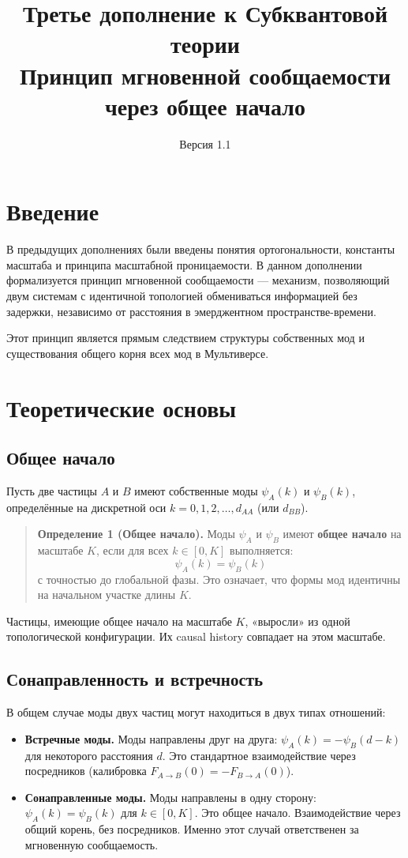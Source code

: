 \documentclass[12pt,a4paper]{article}
\title{\textbf{Третье дополнение к Субквантовой теории}\\
\large Принцип мгновенной сообщаемости через общее начало}
\author{}
\date{Версия 1.1}
\begin{document}
\maketitle

\section{Введение}
В предыдущих дополнениях были введены понятия ортогональности, константы масштаба и принципа масштабной проницаемости. В данном дополнении формализуется принцип мгновенной сообщаемости --- механизм, позволяющий двум системам с идентичной топологией обмениваться информацией без задержки, независимо от расстояния в эмерджентном пространстве-времени.

Этот принцип является прямым следствием структуры собственных мод и существования общего корня всех мод в Мультиверсе.

\section{Теоретические основы}

\subsection{Общее начало}
Пусть две частицы $A$ и $B$ имеют собственные моды $\psi_A(k)$ и $\psi_B(k)$, определённые на дискретной оси $k = 0, 1, 2, \dots, d_{AA}$ (или $d_{BB}$).

\begin{quote}
\textbf{Определение 1 (Общее начало).} Моды $\psi_A$ и $\psi_B$ имеют \textbf{общее начало} на масштабе $K$, если для всех $k \in [0, K]$ выполняется:
\begin{equation}
    \psi_A(k) = \psi_B(k)
\end{equation}
с точностью до глобальной фазы. Это означает, что формы мод идентичны на начальном участке длины $K$.
\end{quote}

Частицы, имеющие общее начало на масштабе $K$, «выросли» из одной топологической конфигурации. Их causal history совпадает на этом масштабе.

\subsection{Сонаправленность и встречность}
В общем случае моды двух частиц могут находиться в двух типах отношений:
\begin{itemize}
    \item \textbf{Встречные моды.} Моды направлены друг на друга: $\psi_A(k) = -\psi_B(d - k)$ для некоторого расстояния $d$. Это стандартное взаимодействие через посредников (калибровка $F_{A \to B}(0) = -F_{B \to A}(0)$).
    \item \textbf{Сонаправленные моды.} Моды направлены в одну сторону: $\psi_A(k) = \psi_B(k)$ для $k \in [0, K]$. Это общее начало. Взаимодействие через общий корень, без посредников. Именно этот случай ответственен за мгновенную сообщаемость.
\end{itemize}
\end{document}
